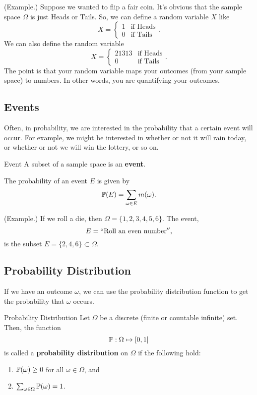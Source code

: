 \begin{mdframed}[]
    (Example.) Suppose we wanted to flip a fair coin. It's obvious that the sample space $\Omega$ is just Heads or Tails. So, we can define a random variable $X$ like 
    \[X = \begin{cases}
        1 & \text{if Heads} \\ 
        0 & \text{if Tails}
    \end{cases}.\] 
    We can also define the random variable 
    \[X = \begin{cases}
        21313 & \text{if Heads} \\ 
        0 & \text{if Tails}
    \end{cases}.\]
    The point is that your random variable maps your outcomes (from your sample space) to numbers. In other words, you are quantifying your outcomes.
\end{mdframed}

\subsection{Events}
Often, in probability, we are interested in the probability that a certain event will occur. For example, we might be interested in whether or not it will rain today, or whether or not we will win the lottery, or so on.

\begin{definition}{Event}{}
    A subset of a sample space is an \textbf{event}.
\end{definition}
The probability of an event $E$ is given by 
\[\mathbb{P}(E) = \sum_{\omega \in E} m(\omega).\]

\begin{mdframed}[]
    (Example.) If we roll a die, then $\Omega = \{1, 2, 3, 4, 5, 6\}$. The event, 
    \[E = ``\text{Roll an even number}'',\]
    is the subset $E = \{2, 4, 6\} \subset \Omega$. 
\end{mdframed}


\subsection{Probability Distribution}
If we have an outcome $\omega$, we can use the probability distribution function to get the probability that $\omega$ occurs. 
\begin{definition}{Probability Distribution}{}
    Let $\Omega$ be a discrete (finite or countable infinite) set. Then, the function 
    \[\mathbb{P}: \Omega \mapsto [0, 1]\]
    is called a \textbf{probability distribution} on $\Omega$ if the following hold: 
    \begin{enumerate}
        \item $\mathbb{P}(\omega) \geq 0$ for all $\omega \in \Omega$, and 
        \item $\sum_{\omega \in \Omega} \mathbb{P}(\omega) = 1$. 
    \end{enumerate}
\end{definition}


